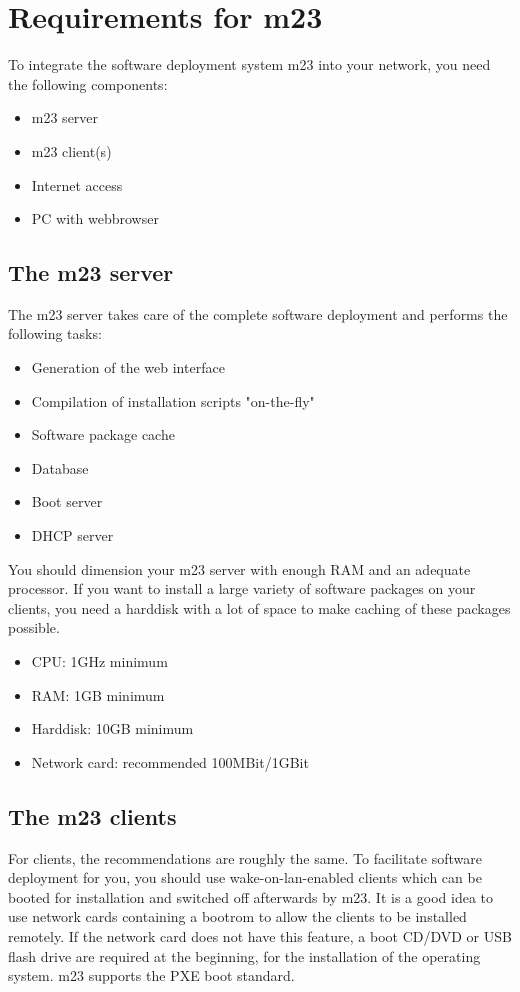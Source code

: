 \chapter{Requirements for m23}
To integrate the software deployment system m23 into your network, you need the following components:
\begin{itemize}
\item m23 server
\item m23 client(s)
\item Internet access
\item PC with webbrowser
\end{itemize}

\section{The m23 server}
The m23 server takes care of the complete software deployment and performs the following tasks:
\begin{itemize}
\item Generation of the web interface
\item Compilation of installation scripts "on-the-fly"
\item Software package cache
\item Database
\item Boot server
\item DHCP server
\end{itemize}
You should dimension your m23 server with enough RAM and an adequate processor. If you want to install a large variety of software packages on your clients, you need a harddisk with a lot of space to make caching of these packages possible.
\begin{itemize}
\item CPU: 1GHz minimum
\item RAM: 1GB minimum
\item Harddisk: 10GB minimum
\item Network card: recommended 100MBit/1GBit
\end{itemize}

\section{The m23 clients}
For clients, the recommendations are roughly the same. To facilitate software deployment for you, you should use wake-on-lan-enabled clients which can be booted for installation and switched off afterwards by m23. It is a good idea to use network cards containing a bootrom to allow the clients to be installed remotely. If the network card does not have this feature, a boot CD/DVD or USB flash drive are required at the beginning, for the installation of the operating system. m23 supports the PXE boot standard.

